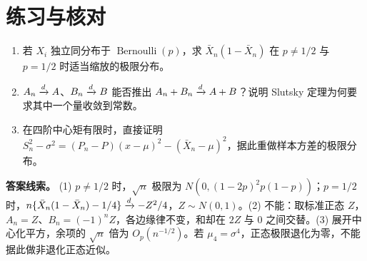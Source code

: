 \section*{练习与核对}
\begin{enumerate}
\item 若 $X_i$ 独立同分布于 $\operatorname{Bernoulli}(p)$，求 $\bar X_n(1-\bar X_n)$ 在 $p\ne1/2$ 与 $p=1/2$ 时适当缩放的极限分布。
\item $A_n\xrightarrow{d} A$、$B_n\xrightarrow{d} B$ 能否推出 $A_n+B_n\xrightarrow{d} A+B$？说明 Slutsky 定理为何要求其中一个量收敛到常数。
\item 在四阶中心矩有限时，直接证明 $S_n^2-\sigma^2=(P_n-P)(x-\mu)^2-(\bar X_n-\mu)^2$，据此重做样本方差的极限分布。
\end{enumerate}
\textbf{答案线索。} (1) $p\ne1/2$ 时，$\sqrt n$ 极限为 $N(0,(1-2p)^2p(1-p))$；$p=1/2$ 时，$n\{\bar X_n(1-\bar X_n)-1/4\}\xrightarrow{d}-Z^2/4$，$Z\sim N(0,1)$。(2) 不能：取标准正态 $Z$，$A_n=Z$、$B_n=(-1)^nZ$，各边缘律不变，和却在 $2Z$ 与 $0$ 之间交替。(3) 展开中心化平方，余项的 $\sqrt n$ 倍为 $O_p(n^{-1/2})$。若 $\mu_4=\sigma^4$，正态极限退化为零，不能据此做非退化正态近似。
